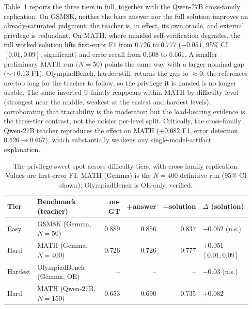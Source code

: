 \documentclass[11pt]{article}
\begin{document}
Table~\ref{tab:sweetspot} reports the three tiers in full, together with the
Qwen-27B cross-family replication. On GSM8K, neither the bare answer nor the
full solution improves an already-saturated judgment; the teacher is, in
effect, its own oracle, and external privilege is redundant. On MATH, where
unaided self-verification degrades, the full worked solution lifts
first-error F1 from $0.726$ to $0.777$ ($+0.051$, 95\% CI $[0.01, 0.09]$,
significant) and error recall from $0.608$ to $0.661$. A smaller preliminary
MATH run ($N=50$) points the same way with a larger nominal gap ($\sim
+0.13$ F1). OlympiadBench, harder still, returns the gap to $\approx 0$: the
references are too long for the teacher to follow, so the privilege it is
handed is no longer usable. The same inverted U faintly reappears within
MATH by difficulty level (strongest near the middle, weakest at the easiest
and hardest levels), corroborating that tractability is the moderator; but
the load-bearing evidence is the three-tier contrast, not the noisier
per-level split. Critically, the cross-family Qwen-27B teacher reproduces
the effect on MATH ($+0.082$ F1, error detection $0.526 \to 0.667$), which
substantially weakens any single-model-artifact explanation.

\begin{table}[t]
\centering
\small
\begin{tabular}{llrrrl}
\toprule
Tier & Benchmark (teacher) & no-GT & +answer & +solution & $\Delta$ (solution) \\
\midrule
Easy & GSM8K (Gemma, $N=50$) & 0.889 & 0.856 & 0.837 & $-0.052$ (n.s.) \\
Hard & MATH (Gemma, $N=400$) & 0.726 & 0.726 & 0.777 & $\mathbf{+0.051}$ $[0.01, 0.09]$ \\
Hardest & OlympiadBench (Gemma, OE) & -- & -- & -- & $-0.03$ (n.s.) \\
\midrule
Hard & MATH (Qwen-27B, $N=150$) & 0.653 & 0.690 & 0.735 & $+0.082$ \\
\bottomrule
\end{tabular}
\caption{The privilege sweet spot across difficulty tiers, with cross-family
replication. Values are first-error F1. MATH (Gemma) is the $N=400$
definitive run (95\% CI shown); OlympiadBench is OE-only, verified.}
\label{tab:sweetspot}
\end{table}
\end{document}
